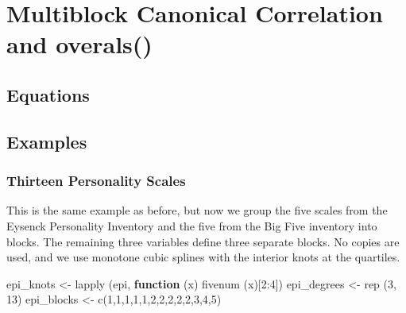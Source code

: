 \documentclass[
  12pt,
]{book}
\newenvironment{Shaded}{\begin{snugshade}}{\end{snugshade}}
\newcommand{\ControlFlowTok}[1]{\textcolor[rgb]{0.13,0.29,0.53}{\textbf{#1}}}
\newcommand{\DecValTok}[1]{\textcolor[rgb]{0.00,0.00,0.81}{#1}}
\newcommand{\FunctionTok}[1]{\textcolor[rgb]{0.00,0.00,0.00}{#1}}
\newcommand{\NormalTok}[1]{#1}
\newcommand{\OtherTok}[1]{\textcolor[rgb]{0.56,0.35,0.01}{#1}}
\newcommand{\SpecialCharTok}[1]{\textcolor[rgb]{0.00,0.00,0.00}{#1}}
\begin{document}
\hypertarget{multiblock-canonical-correlation-and-overals}{%
\chapter{Multiblock Canonical Correlation and overals()}\label{multiblock-canonical-correlation-and-overals}}

\hypertarget{equations-6}{%
\section{Equations}\label{equations-6}}

\hypertarget{examples-6}{%
\section{Examples}\label{examples-6}}

\hypertarget{thirteen-personality-scales-2}{%
\subsection{Thirteen Personality Scales}\label{thirteen-personality-scales-2}}

This is the same example as before, but now we group the five scales from the Eysenck Personality Inventory and the five from the Big Five inventory into blocks. The remaining three variables define three separate blocks. No copies are used, and we use monotone cubic splines with the interior knots at the quartiles.

\begin{Shaded}
\begin{Highlighting}[]
\NormalTok{epi\_knots }\OtherTok{\textless{}{-}} \FunctionTok{lapply}\NormalTok{ (epi, }\ControlFlowTok{function}\NormalTok{ (x) }\FunctionTok{fivenum}\NormalTok{ (x)[}\DecValTok{2}\SpecialCharTok{:}\DecValTok{4}\NormalTok{])}
\NormalTok{epi\_degrees }\OtherTok{\textless{}{-}} \FunctionTok{rep}\NormalTok{ (}\DecValTok{3}\NormalTok{, }\DecValTok{13}\NormalTok{)}
\NormalTok{epi\_blocks }\OtherTok{\textless{}{-}} \FunctionTok{c}\NormalTok{(}\DecValTok{1}\NormalTok{,}\DecValTok{1}\NormalTok{,}\DecValTok{1}\NormalTok{,}\DecValTok{1}\NormalTok{,}\DecValTok{1}\NormalTok{,}\DecValTok{2}\NormalTok{,}\DecValTok{2}\NormalTok{,}\DecValTok{2}\NormalTok{,}\DecValTok{2}\NormalTok{,}\DecValTok{2}\NormalTok{,}\DecValTok{3}\NormalTok{,}\DecValTok{4}\NormalTok{,}\DecValTok{5}\NormalTok{)}
\end{Highlighting}
\end{Shaded}
\end{document}
